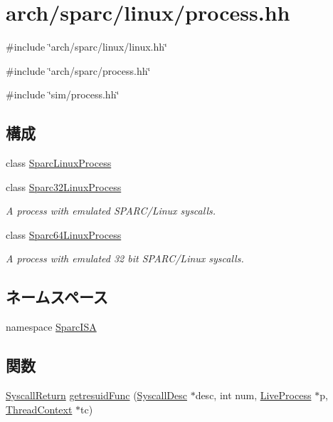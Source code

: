 \hypertarget{arch_2sparc_2linux_2process_8hh}{
\section{arch/sparc/linux/process.hh}
\label{arch_2sparc_2linux_2process_8hh}
}
{\ttfamily \#include \char`\"{}arch/sparc/linux/linux.hh\char`\"{}}\par
{\ttfamily \#include \char`\"{}arch/sparc/process.hh\char`\"{}}\par
{\ttfamily \#include \char`\"{}sim/process.hh\char`\"{}}\par
\subsection*{構成}
\begin{DoxyCompactItemize}
\item 
class \hyperlink{classSparcISA_1_1SparcLinuxProcess}{SparcLinuxProcess}
\item 
class \hyperlink{classSparcISA_1_1Sparc32LinuxProcess}{Sparc32LinuxProcess}
\begin{DoxyCompactList}\small\item\em A process with emulated SPARC/Linux syscalls. \item\end{DoxyCompactList}\item 
class \hyperlink{classSparcISA_1_1Sparc64LinuxProcess}{Sparc64LinuxProcess}
\begin{DoxyCompactList}\small\item\em A process with emulated 32 bit SPARC/Linux syscalls. \item\end{DoxyCompactList}\end{DoxyCompactItemize}
\subsection*{ネームスペース}
\begin{DoxyCompactItemize}
\item 
namespace \hyperlink{namespaceSparcISA}{SparcISA}
\end{DoxyCompactItemize}
\subsection*{関数}
\begin{DoxyCompactItemize}
\item 
\hyperlink{classSyscallReturn}{SyscallReturn} \hyperlink{namespaceSparcISA_a313b9d62bcf3a577491d7411bf69088b}{getresuidFunc} (\hyperlink{classSyscallDesc}{SyscallDesc} $\ast$desc, int num, \hyperlink{classLiveProcess}{LiveProcess} $\ast$p, \hyperlink{classThreadContext}{ThreadContext} $\ast$tc)
\end{DoxyCompactItemize}
